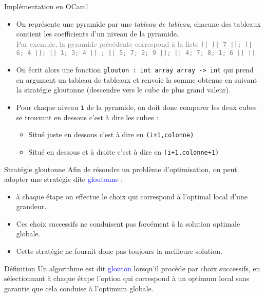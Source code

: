 \documentclass[10pt]{beamer}
\begin{document}
\begin{frame}{\Ctitle}{\stitle}
	\begin{block}{Implémentation en OCaml}
		\begin{itemize}
			\item<1-> On représente une pyramide par une \textit{tableau de tableau}, chacune des tableaux contient les coefficients d'un niveau de la pyramide.\\
			\textcolor{gray}{\small Par exemple, la pyramide  précédente correspond à la liste \texttt{[| [| 7 |]; [| 6; 4 |]; [| 1; 3; 4 |] ; [| 5; 7; 2; 9 |]; [| 4; 7; 8; 1; 6 |] |]}}
			\item<2-> On écrit alors une fonction \texttt{glouton : int array array -> int} qui prend en argument un tableau de tableaux et renvoie la somme obtenue en suivant la stratégie gloutonne (descendre vers le cube de plus grand valeur). 
			\item<3-> Pour chaque niveau {\tt i} de la pyramide, on doit donc comparer les deux cubes se trouvant en dessous c'est à dire les cubes :
			\begin{itemize}
			\item<3-> Situé juste en dessous c'est à dire en {\tt (i+1,colonne)} 
			\item<3-> Situé en dessous et à droite c'est à dire en {\tt (i+1,colonne+1)}
			\end{itemize}
		\end{itemize}
	\end{block}
	\end{frame}

	\begin{frame}{\Ctitle}{\stitle}
		\begin{block}{Stratégie gloutonne}
			Afin de résoudre un problème d'optimisation, on peut adopter une stratégie dite \textcolor{blue}{gloutonne} :
			\begin{itemize}
				\item<2-> à chaque étape on effectue le choix qui correspond à l'optimal \textcolor{BrickRed}{local} d'une grandeur.
				\item<3-> Ces choix successifs ne conduisent pas forcément à la solution optimale \textcolor{BrickRed}{globale}.
				\item<4-> Cette stratégie ne fournit donc pas toujours la \textcolor{BrickRed}{meilleure solution}.
			\end{itemize}
		\end{block}
		{\begin{alertblock}{Définition}
			Un algorithme est dit \textcolor{blue}{glouton} lorsqu'il procède par choix successifs, en sélectionnant à chaque étape l'option qui correspond à un optimum local sans garantie que cela conduise à l'optimum globale.
		\end{alertblock}}
	\end{frame}
\end{document}
